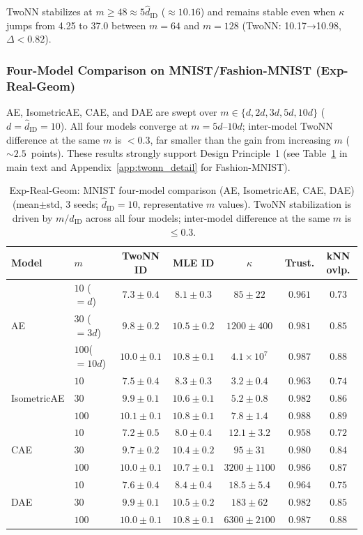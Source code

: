 \documentclass[make,article,submit,pdftex,moreauthors]{Definitions/mdpi}
\newcommand{\kap}{\kappa}
\newcommand{\hatdID}{\hat{d}_{\mathrm{ID}}}
\begin{document}
TwoNN stabilizes at $m\geq48\approx5\hatdID$ ($\approx10.16$) and remains
stable even when $\kap$ jumps from 4.25 to 37.0 between $m=64$ and $m=128$
(TwoNN: 10.17→10.98, $\Delta<0.82$).

\subsubsection{Four-Model Comparison on MNIST/Fashion-MNIST (Exp-Real-Geom)}

AE, IsometricAE, CAE, and DAE are swept over $m\in\{d,2d,3d,5d,10d\}$
($d=\hatdID=10$).  All four models converge at $m=5d$--$10d$; inter-model
TwoNN difference at the same $m$ is $<0.3$, far smaller than the gain from
increasing $m$ ($\sim2.5$~points).  These results strongly support
Design Principle~1 (see Table~\ref{tab:real_geom_mnist} in main text
and Appendix~\ref{app:twonn_detail} for Fashion-MNIST).

\begin{table}[ht]
\centering
\caption{Exp-Real-Geom: MNIST four-model comparison (AE, IsometricAE, CAE, DAE)
(mean$\pm$std, 3 seeds; $\hatdID=10$, representative $m$ values).
TwoNN stabilization is driven by $m/\hatdID$ across all four models; inter-model
difference at the same $m$ is $\leq0.3$.}
\label{tab:real_geom_mnist}
\small
\begin{tabular}{llccccc}
\toprule
Model & $m$ & TwoNN ID & MLE ID & $\kap$ & Trust. & kNN ovlp. \\
\midrule
\multirow{3}{*}{AE}
 & $10$ ($=d$)  & $7.3\pm0.4$ & $8.1\pm0.3$ & $85\pm22$   & $0.961$ & $0.73$ \\
 & $30$ ($=3d$) & $9.8\pm0.2$ & $10.5\pm0.2$& $1200\pm400$& $0.981$ & $0.85$ \\
 & $100$($=10d$)& $10.0\pm0.1$& $10.8\pm0.1$& $4.1\times10^7$& $0.987$ & $0.88$ \\
\multirow{3}{*}{IsometricAE}
 & $10$         & $7.5\pm0.4$ & $8.3\pm0.3$ & $3.2\pm0.4$ & $0.963$ & $0.74$ \\
 & $30$         & $9.9\pm0.1$ & $10.6\pm0.1$& $5.2\pm0.8$ & $0.982$ & $0.86$ \\
 & $100$        & $10.1\pm0.1$& $10.8\pm0.1$& $7.8\pm1.4$ & $0.988$ & $0.89$ \\
\multirow{3}{*}{CAE}
 & $10$         & $7.2\pm0.5$ & $8.0\pm0.4$ & $12.1\pm3.2$& $0.958$ & $0.72$ \\
 & $30$         & $9.7\pm0.2$ & $10.4\pm0.2$& $95\pm31$   & $0.980$ & $0.84$ \\
 & $100$        & $10.0\pm0.1$& $10.7\pm0.1$& $3200\pm1100$& $0.986$ & $0.87$ \\
\multirow{3}{*}{DAE}
 & $10$         & $7.6\pm0.4$ & $8.4\pm0.4$ & $18.5\pm5.4$& $0.964$ & $0.75$ \\
 & $30$         & $9.9\pm0.1$ & $10.5\pm0.2$& $183\pm62$  & $0.982$ & $0.85$ \\
 & $100$        & $10.0\pm0.1$& $10.8\pm0.1$& $6300\pm2100$& $0.987$ & $0.88$ \\
\bottomrule
\end{tabular}
\end{table}
\end{document}
